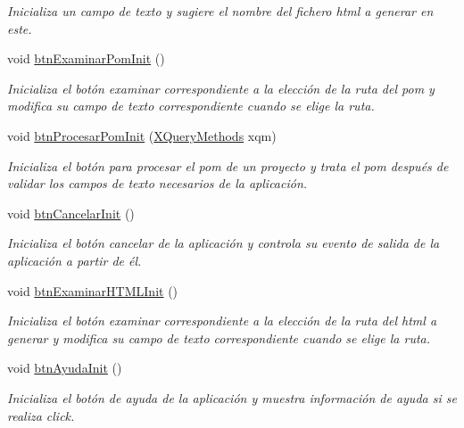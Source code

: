 \begin{DoxyCompactItemize}
\begin{DoxyCompactList}\small\item\em Inicializa un campo de texto y sugiere el nombre del fichero html a generar en este. \end{DoxyCompactList}\item 
void \mbox{\hyperlink{a00029_a8e25f512501551f46bb24a415036f15b}{btn\+Examinar\+Pom\+Init}} ()
\begin{DoxyCompactList}\small\item\em Inicializa el botón examinar correspondiente a la elección de la ruta del pom y modifica su campo de texto correspondiente cuando se elige la ruta. \end{DoxyCompactList}\item 
void \mbox{\hyperlink{a00029_a9bc18b3b0b00c0c7cd1e2852abefd3aa}{btn\+Procesar\+Pom\+Init}} (\mbox{\hyperlink{a00033}{X\+Query\+Methods}} xqm)
\begin{DoxyCompactList}\small\item\em Inicializa el botón para procesar el pom de un proyecto y trata el pom después de validar los campos de texto necesarios de la aplicación. \end{DoxyCompactList}\item 
void \mbox{\hyperlink{a00029_adddaf261f4abfb185dbaff370be28bef}{btn\+Cancelar\+Init}} ()
\begin{DoxyCompactList}\small\item\em Inicializa el botón cancelar de la aplicación y controla su evento de salida de la aplicación a partir de él. \end{DoxyCompactList}\item 
void \mbox{\hyperlink{a00029_aec83fb7dda0b4f2fdfc404ba2330b37a}{btn\+Examinar\+H\+T\+M\+L\+Init}} ()
\begin{DoxyCompactList}\small\item\em Inicializa el botón examinar correspondiente a la elección de la ruta del html a generar y modifica su campo de texto correspondiente cuando se elige la ruta. \end{DoxyCompactList}\item 
void \mbox{\hyperlink{a00029_a0b62d43fe793951471585f524b8963f0}{btn\+Ayuda\+Init}} ()
\begin{DoxyCompactList}\small\item\em Inicializa el botón de ayuda de la aplicación y muestra información de ayuda si se realiza click. \end{DoxyCompactList}\end{DoxyCompactItemize}
